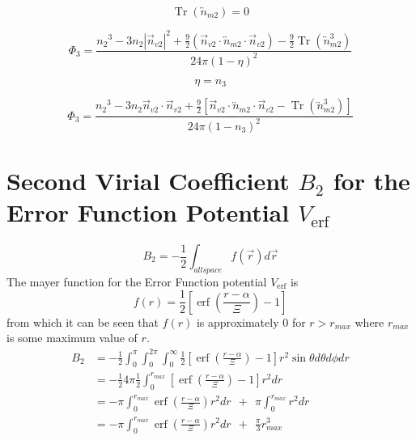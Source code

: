 \documentclass[double,12pt]{beavtex}
\begin{document}
\begin{equation}{\operatorname{Tr}(\overleftrightarrow{n}_{m2})=0}\end{equation} 

\begin{equation}{\Phi_3=\frac{{n_2}^3-3n_2|\vec{n}_{v2}|^2+\frac{9}{2}(\vec{n}_{v2}\cdot{\overleftrightarrow{n}_{m2}}\cdot{\vec{n}_{v2}})-\frac{9}{2}\operatorname{Tr}({\overleftrightarrow{n}^3_{m2}})}{24\pi(1-\eta)^2}}\end{equation} 

\begin{equation}{\eta=n_3}\end{equation} 

\begin{equation}{\Phi_3=\frac{{n_2}^3-3n_2\vec{n}_{v2}\cdot\vec{n}_{v2}+\frac{9}{2}[\vec{n}_{v2}\cdot{\overleftrightarrow{n}_{m2}}\cdot{\vec{n}_{v2}}-\operatorname{Tr}({\overleftrightarrow{n}^3_{m2}})]}{24\pi(1-n_3)^2}}\end{equation} 


\section{Second Virial Coefficient $B_{2}$ for the Error Function Potential $V_{\operatorname{erf}}$}
\begin{equation}B_2=-\frac{1}{2}\int_{allspace}f(\vec{r})d\vec r\end{equation}
The mayer function for the Error Function potential $V_{\operatorname{erf}}$ is
\begin{equation}f(r)=\frac{1}{2}\left[\operatorname{erf}\left(\frac{r-\alpha}{\Xi}\right)-1\right]\end{equation} from which it can be seen that $f(r)$ is approximately 0 for $r>r_{max}$ where $r_{max}$ is some maximum value of $r$.
\begin{align}
 B_2 &= -\frac{1}{2}\int_0^{\pi}\int_0^{2\pi}\int_0^\infty\frac{1}{2}\left[\operatorname{erf}\left(\frac{r-\alpha}{\Xi}\right)-1\right]r^2\sin{\theta}d{\theta}d{\phi}dr \\
     &= -\frac{1}{2}4\pi\frac{1}{2}\int_{0}^{r_{max}}\left[\operatorname{erf}\left(\frac{r-\alpha}{\Xi}\right)-1\right]r^2dr \\
     &= -\pi\int_{0}^{r_{max}}\operatorname{erf}\left(\frac{r-\alpha}{\Xi}\right)r^2dr {~~}+{~~} \pi\int_0^{r_{max}}r^2dr   \\
     &= -\pi\int_{0}^{r_{max}}\operatorname{erf}\left(\frac{r-\alpha}{\Xi}\right)r^2dr {~~}+{~~} \frac{\pi}{3}r_{max}^3   
\end{align}
\end{document}
